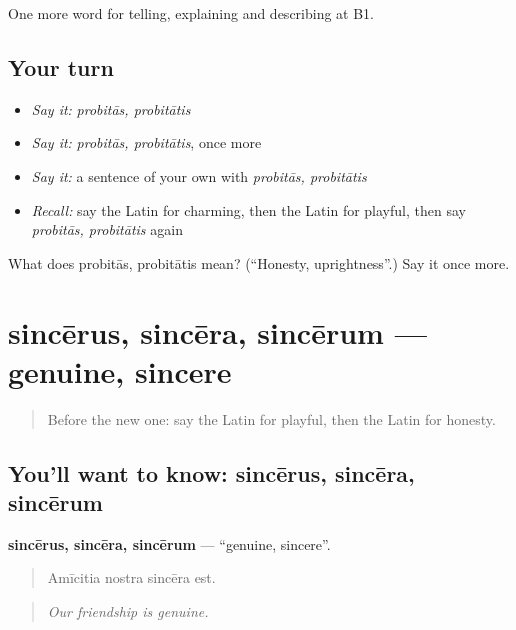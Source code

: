 \begin{grammarlens}[title={What you've built}]
One more word for telling, explaining and describing at B1.
\end{grammarlens}

\subsection*{Your turn}
\begin{itemize}
\raggedright
  \item \emph{Say it:} \emph{probitās, probitātis}
  \item \emph{Say it:} \emph{probitās, probitātis}, once more
  \item \emph{Say it:} a sentence of your own with \emph{probitās, probitātis}
  \item \emph{Recall:} say the Latin for charming, then the Latin for playful, then say \emph{probitās, probitātis} again
\end{itemize}

\begin{tcolorbox}[breakable,colback=teal!4,colframe=teal!35!black,title={Before you move on}]
What does probitās, probitātis mean? (\textquotedblleft{}Honesty, uprightness\textquotedblright{}.) Say it once more.
\end{tcolorbox}
\section[sincērus, sincēra, sincērum]{sincērus, sincēra, sincērum — genuine, sincere}

\label{lesson:LA-C504-sincerus}



\begin{quote}
Before the new one: say the Latin for playful, then the Latin for honesty.
\end{quote}

\subsection*{You'll want to know: sincērus, sincēra, sincērum}
\textbf{sincērus, sincēra, sincērum} — \textquotedblleft{}genuine, sincere\textquotedblright{}.

\begin{quote}
Amīcitia nostra sincēra est.
\end{quote}

\begin{quote}
\emph{Our friendship is genuine.}
\end{quote}

